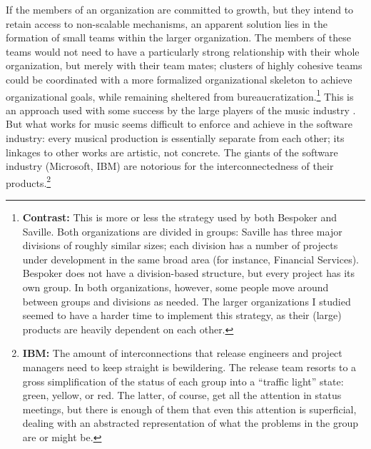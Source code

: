 If the members of an organization are committed to growth, but they intend to retain access to non-scalable mechanisms, an apparent solution lies in the formation of small teams within the larger organization. The members of these teams would not need to have a particularly strong relationship with their whole organization, but merely with their team mates; clusters of highly cohesive teams could be coordinated with a more formalized organizational skeleton to achieve organizational goals, while remaining sheltered from bureaucratization.\footnote{\textbf{Contrast:} This is more or less the strategy used by both Bespoker and Saville. Both organizations are divided in groups: Saville has three major divisions of roughly similar sizes; each division has a number of projects under development in the same broad area (for instance, Financial Services). Bespoker does not have a division-based structure, but every project has its own group. In both organizations, however, some people move around between groups and divisions as needed. The larger organizations I studied seemed to have a harder time to implement this strategy, as their (large) products are heavily dependent on each other.} This is an approach used with some success by the large players of the music industry \cite{Lopes1992}. But what works for music seems difficult to enforce and achieve in the software industry: every musical production is essentially separate from each other; its linkages to other works are artistic, not concrete. The giants of the software industry (Microsoft, IBM) are notorious for the interconnectedness of their products.\footnote{\textbf{IBM:} The amount of interconnections that release engineers and project managers need to keep straight is bewildering. The release team resorts to a gross simplification of the status of each group into a ``traffic light'' state: green, yellow, or red. The latter, of course, get all the attention in status meetings, but there is enough of them that even this attention is superficial, dealing with an abstracted representation of what the problems in the group are or might be.
}

